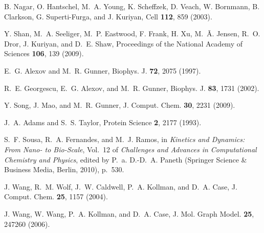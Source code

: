\documentclass[aps,prl,preprint,nofootinbib,superscriptaddress,linenumbers]{revtex4-1}
\begin{document}
\begin{thebibliography}{100}
B. Nagar, O. Hantschel, M.~A. Young, K. Scheffzek, D. Veach, W. Bornmann, B.
  Clarkson, G. Superti-Furga, and J. Kuriyan, Cell {\bf 112},  859  (2003).

Y. Shan, M.~A. Seeliger, M.~P. Eastwood, F. Frank, H. Xu, M.~Ã. Jensen, R.~O.
  Dror, J. Kuriyan, and D.~E. Shaw, Proceedings of the National Academy of
  Sciences {\bf 106},  139  (2009).

E.~G. Alexov and M.~R. Gunner, Biophys. J. {\bf 72},  2075  (1997).

R.~E. Georgescu, E.~G. Alexov, and M.~R. Gunner, Biophys. J. {\bf 83},  1731
  (2002).

Y. Song, J. Mao, and M.~R. Gunner, J. Comput. Chem. {\bf 30},  2231  (2009).

J.~A. Adams and S.~S. Taylor, Protein Science {\bf 2},  2177  (1993).

S.~F. Sousa, R.~A. Fernandes, and M.~J. Ramos,  in {\em Kinetics and
  {Dynamics}: {From} {Nano}- to {Bio}-{Scale}}, Vol.~12 of {\em Challenges and
  {Advances} in {Computational} {Chemistry} and {Physics}}, edited by P.~a.
  D.-D.~A. Paneth (Springer Science \& Business Media, Berlin, 2010), p.\ 530.

J. Wang, R.~M. Wolf, J.~W. Caldwell, P.~A. Kollman, and D.~A. Case, J. Comput.
  Chem. {\bf 25},  1157  (2004).

J. Wang, W. Wang, P.~A. Kollman, and D.~A. Case, J. Mol. Graph Model. {\bf 25},
   247260  (2006).

\end{thebibliography}



\onecolumngrid
\newpage

\end{document}
